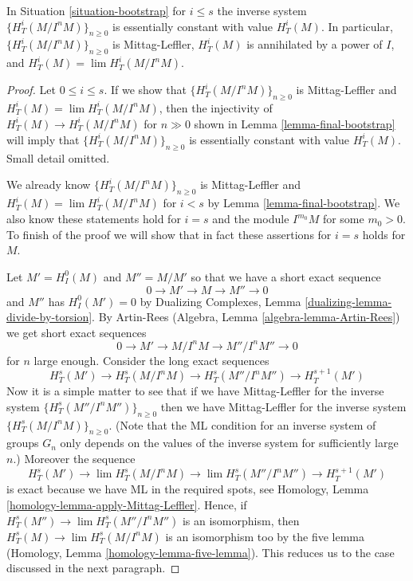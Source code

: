 \begin{theorem}
\label{theorem-final-bootstrap}
In Situation \ref{situation-bootstrap} for $i \leq s$ the inverse system
$\{H^i_T(M/I^nM)\}_{n \geq 0}$ is essentially constant with value $H^i_T(M)$.
In particular, $\{H^i_T(M/I^nM)\}_{n \geq 0}$ is Mittag-Leffler,
$H^i_T(M)$ is annihilated by a power of $I$, and
$H^i_T(M) = \lim H^i_T(M/I^nM)$.
\end{theorem}

\begin{proof}
Let $0 \leq i \leq s$.
If we show that $\{H^i_T(M/I^nM)\}_{n \geq 0}$ is Mittag-Leffler and
$H^i_T(M) = \lim H^i_T(M/I^nM)$, then the injectivity of
$H^i_T(M) \to H^i_T(M/I^nM)$ for $n \gg 0$ shown in
Lemma \ref{lemma-final-bootstrap} will imply that
$\{H^i_T(M/I^nM)\}_{n \geq 0}$ is essentially constant with value $H^i_T(M)$.
Small detail omitted.

\medskip\noindent
We already know $\{H^i_T(M/I^nM)\}_{n \geq 0}$ is Mittag-Leffler and
$H^i_T(M) = \lim H^i_T(M/I^nM)$ for $i < s$ by
Lemma \ref{lemma-final-bootstrap}. We also know these statements hold
for $i = s$ and the module $I^{m_0}M$ for some $m_0 > 0$.
To finish of the proof we will show that in fact these
assertions for $i = s$ holds for $M$.

\medskip\noindent
Let $M' = H^0_I(M)$ and $M'' = M/M'$ so that we have a short exact
sequence
$$
0 \to M' \to M \to M'' \to 0
$$
and $M''$ has $H^0_I(M') = 0$ by
Dualizing Complexes, Lemma \ref{dualizing-lemma-divide-by-torsion}.
By Artin-Rees (Algebra, Lemma \ref{algebra-lemma-Artin-Rees})
we get short exact sequences
$$
0 \to M' \to M/I^n M \to M''/I^n M'' \to 0
$$
for $n$ large enough. Consider the long exact sequences
$$
H^s_T(M') \to
H^s_T(M/I^nM) \to
H^s_T(M''/I^nM'') \to
H^{s + 1}_T(M')
$$
Now it is a simple matter to see that if we have Mittag-Leffler
for the inverse system $\{H^s_T(M''/I^nM'')\}_{n \geq 0}$
then we have Mittag-Leffler for the inverse system
$\{H^s_T(M/I^nM)\}_{n \geq 0}$.
(Note that the ML condition for an inverse system of groups $G_n$
only depends on the values of the inverse system for sufficiently large $n$.)
Moreover the sequence
$$
H^s_T(M') \to
\lim H^s_T(M/I^nM) \to
\lim H^s_T(M''/I^nM'') \to
H^{s + 1}_T(M')
$$
is exact because we have ML in the required spots, see
Homology, Lemma \ref{homology-lemma-apply-Mittag-Leffler}.
Hence, if $H^s_T(M'') \to \lim H^s_T(M''/I^nM'')$
is an isomorphism, then
$H^s_T(M) \to \lim H^s_T(M/I^nM)$
is an isomorphism too by the five lemma
(Homology, Lemma \ref{homology-lemma-five-lemma}).
This reduces us to the case discussed in the next paragraph.


\end{proof}
